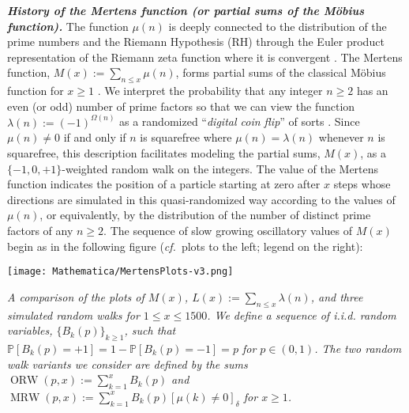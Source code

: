 \documentclass[10pt,reqno,letterpaper]{article}
\theoremstyle{plain}
\numberwithin{theorem}{section}
\theoremstyle{definition}
\newcommand{\cf}[0]{\emph{cf.}\ }
\newcommand{\Iverson}[1]{\ensuremath{\left[#1\right]_{\delta}}}
\newcommand{\seqnum}[1]{\href{http://oeis.org/#1}{\color{Gray!50!Black}{\underline{#1}}}}
\begin{document}
\vskip -0.5mm
\noindent
{\normalsize \textbf{\emph{History of the Mertens function (or partial sums of the M\"obius function).}}} 
The function $\mu(n)$ is deeply connected to the 
distribution of the prime numbers and the Riemann Hypothesis (RH) 
through the Euler product representation of the Riemann zeta 
function where it is convergent \cite{APOSTOLANUMT}. 
The Mertens function, $M(x) := \sum_{n \leq x} \mu(n)$, forms partial sums 
of the classical M\"obius function for $x \geq 1$ \cite[\seqnum{A008683}; \seqnum{A002321}]{OEIS}.
We interpret the probability that any integer $n \geq 2$ has an even (or odd) number of prime 
factors so that we can view the function $\lambda(n) := (-1)^{\Omega(n)}$ as a 
randomized ``\emph{digital coin flip}'' of sorts 
\cite[\seqnum{A008836}; \seqnum{A002819}]{OEIS}. Since $\mu(n) \neq 0$ if and only if 
$n$ is squarefree where $\mu(n) = \lambda(n)$ whenever 
$n$ is squarefree, this description facilitates modeling the 
partial sums, $M(x)$, as a $\{-1,0,+1\}$-weighted random walk on the integers. 
The value of the Mertens function indicates the position of a particle starting at zero 
after $x$ steps whose directions are simulated in this quasi-randomized way according to 
the values of $\mu(n)$, or equivalently, by the distribution of the number of distinct prime factors of 
any $n \geq 2$. 
The sequence of slow growing oscillatory values of $M(x)$ begin 
as in the following figure (\cf plots to the left; legend on the right): \\[0.3ex] 
\begin{minipage}{0.53\textwidth}
     \texttt{[image: Mathematica/MertensPlots-v3.png]}
\end{minipage} \hfill
\begin{minipage}{0.425\textwidth}
\begin{tcolorbox}[height=1.6in,width=\linewidth,halign=justify,boxsep=0mm,arc=2.25mm,colframe=gray!49]
\vskip -0.65mm
\em\small 
A comparison of the plots of $M(x)$, $L(x) := \sum_{n \leq x} \lambda(n)$, and 
three simulated random walks for $1 \leq x \leq 1500$. 
We define a sequence of i.i.d. random variables, $\{B_k(p)\}_{k \geq 1}$, such that 
$\mathbb{P}[B_k(p) = +1] = 1 - \mathbb{P}[B_k(p) = -1] = p$ for $p \in (0, 1)$. 
The two random walk variants we consider are defined by the sums 
$\operatorname{ORW}(p, x) := \sum_{k=1}^{x} B_k(p)$ and 
$\operatorname{MRW}(p, x) := \sum_{k=1}^{x} B_k(p) \Iverson{\mu(k) \neq 0}$ for $x \geq 1$. 
\end{tcolorbox}
\end{minipage} \\[0.21ex]
\end{document}
